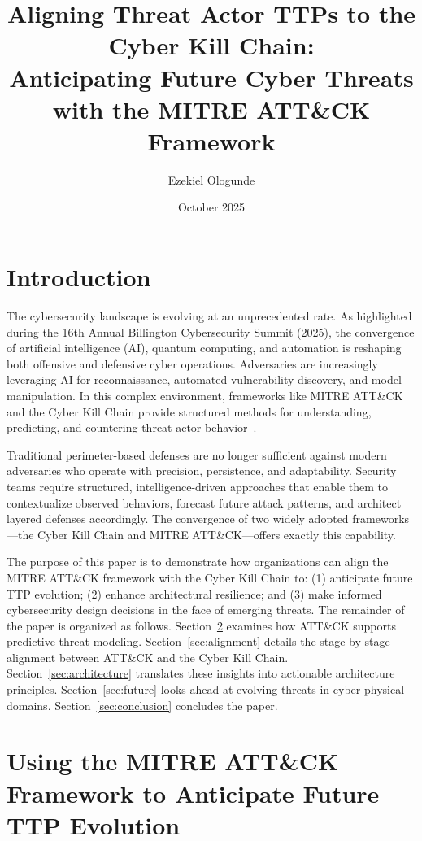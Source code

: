 \documentclass[sigconf,nonacm]{acmart}
\title{Aligning Threat Actor TTPs to the Cyber Kill Chain:\\
Anticipating Future Cyber Threats with the MITRE ATT\&CK Framework}
\author{Ezekiel Ologunde}
\affiliation{%
  \institution{Independent Researcher}
  \country{United States}
}
\date{October 2025}
\begin{document}
\maketitle

\section{Introduction}

The cybersecurity landscape is evolving at an unprecedented rate. As highlighted
during the 16th Annual Billington Cybersecurity Summit (2025), the convergence of
artificial intelligence (AI), quantum computing, and automation is reshaping both
offensive and defensive cyber operations. Adversaries are increasingly leveraging AI for
reconnaissance, automated vulnerability discovery, and model manipulation. In this
complex environment, frameworks like MITRE ATT\&CK and the Cyber Kill Chain
provide structured methods for understanding, predicting, and countering threat actor
behavior~\cite{mitre2025}.

Traditional perimeter-based defenses are no longer sufficient against modern adversaries
who operate with precision, persistence, and adaptability. Security teams require
structured, intelligence-driven approaches that enable them to contextualize observed
behaviors, forecast future attack patterns, and architect layered defenses accordingly.
The convergence of two widely adopted frameworks---the Cyber Kill Chain and
MITRE ATT\&CK---offers exactly this capability.

The purpose of this paper is to demonstrate how organizations can align the MITRE
ATT\&CK framework with the Cyber Kill Chain to: (1) anticipate future TTP
evolution; (2) enhance architectural resilience; and (3) make informed cybersecurity
design decisions in the face of emerging threats. The remainder of the paper is
organized as follows. Section~\ref{sec:anticipate} examines how ATT\&CK supports
predictive threat modeling. Section~\ref{sec:alignment} details the stage-by-stage
alignment between ATT\&CK and the Cyber Kill Chain. Section~\ref{sec:architecture}
translates these insights into actionable architecture principles. Section~\ref{sec:future}
looks ahead at evolving threats in cyber-physical domains. Section~\ref{sec:conclusion}
concludes the paper.

\section{Using the MITRE ATT\&CK Framework to Anticipate Future TTP Evolution}
\label{sec:anticipate}
\end{document}
